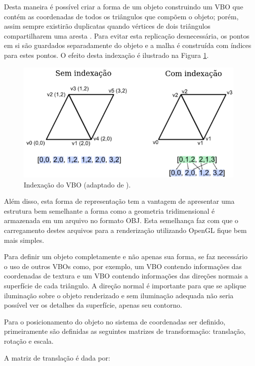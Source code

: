 {%

Desta maneira é possível criar a forma de um objeto construindo um VBO que
contém as coordenadas de todos os triângulos que compõem o objeto; porém, assim
sempre existirão duplicatas quando vértices de dois triângulos compartilharem
uma aresta \cite{openGlTutorial}. Para evitar esta replicação desnecessária, os
pontos em si são guardados separadamente do objeto e a malha é construída com
índices para estes pontos. O efeito desta indexação é ilustrado na Figura
\ref{fig:VBO}.

\begin{figure}[h!]
\centering
\includegraphics[width=.5\linewidth]{figs/TG_VBO_index_pt.png}
\caption{Indexação do VBO (adaptado de \cite{openGlTutorial}).}
\label{fig:VBO}
\end{figure}

Além disso, esta forma de representação tem a  vantagem de apresentar uma
estrutura bem semelhante a forma como a geometria tridimensional  é armazenada
em um arquivo no formato OBJ. Esta semelhança faz com que o carregamento destes
arquivos para a renderização utilizando OpenGL fique bem mais simples.

Para definir um objeto completamente e não apenas sua forma, se faz necessário o
uso de outros VBOs como, por exemplo, um VBO contendo informações das
coordenadas de textura e um VBO contendo informações das direções normais a
superfície de cada triângulo. A direção normal é importante para que se aplique
iluminação sobre o objeto renderizado e sem iluminação adequada não seria
possível ver os detalhes da superfície, apenas seu contorno.


Para o posicionamento do objeto no sistema de coordenadas ser definido,
primeiramente são definidas as seguintes matrizes de transformação: translação,
rotação e escala.

A matriz de translação é dada por:

}
